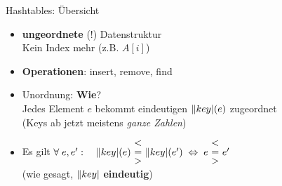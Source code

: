 \begin{frame}{Hashtables: Übersicht}
	\begin{itemize}
			\item \textbf{ungeordnete} (!) Datenstruktur \\
			\impl Kein Index mehr (z.B. $A[i]$) 
			\pause
			\item \textbf{Operationen}: insert, remove, find
			\forcenewline \pause
			\item Unordnung: \textbf{Wie}? \\
			\impl Jedes Element $e$ bekommt eindeutigen $\|key|(e)$ zugeordnet \\ (Keys ab jetzt meistens \textit{ganze Zahlen})
			\pause
			\item Es gilt
			$\forall\; e, e': \quad \key(e) \ \stackedtight{< \\ = \\ >}\ \key(e') \gdw e \ \stackedtight{< \\ = \\ >} \ e'$ \\ (wie gesagt, $\|key|$ \textbf{eindeutig})
	\end{itemize} 
\end{frame}



